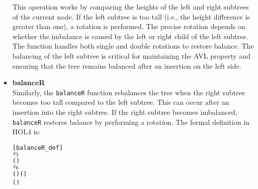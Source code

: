 \documentclass[12pt]{article}
\begin{document}
\begin{itemize}
  This operation works by comparing the heights of the left and right subtrees of the current node. If the left subtree is too tall (i.e., the height difference is greater than one), a rotation is performed. The precise rotation depends on whether the imbalance is caused by the left or right child of the left subtree. The function handles both single and double rotations to restore balance. The balancing of the left subtree is critical for maintaining the AVL property and ensuring that the tree remains balanced after an insertion on the left side.

  \item \textbf{balanceR} \\
  Similarly, the \texttt{balanceR} function rebalances the tree when the right subtree becomes too tall compared to the left subtree. This can occur after an insertion into the right subtree. If the right subtree becomes imbalanced, \texttt{balanceR} restores balance by performing a rotation. The formal definition in HOL4 is:

\begin{alltt}
[balanceR_def]
\HOLTokenTurnstile{}      \HOLSymConst{=}
      \HOLSymConst{=}   \HOLSymConst{\ensuremath{+}}  
       
        \HOLTokenImp{}     
     \HOLTokenBar{}  \ensuremath{\HOLBoundVar{v}\sb{\mathrm{1}}}     \HOLTokenImp{}
          \HOLSymConst{\HOLTokenGt{}}   
           
            \HOLTokenImp{}    (    ) 
         \HOLTokenBar{}  \ensuremath{\HOLBoundVar{v}\sb{\mathrm{6}}}     \HOLTokenImp{}
              (    ) (    )
           (    ) 
        
\end{alltt}


\end{itemize}
\end{document}
